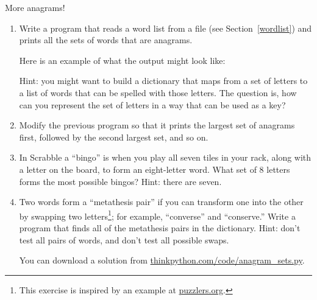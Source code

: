 \begin{exercise}
\label{anagrams}


More anagrams!

\begin{enumerate}

\item Write a program
that reads a word list from a file (see Section~\ref{wordlist}) and
prints all the sets of words that are anagrams.

Here is an example of what the output might look like:

\beforeverb
\begin{pyexo}
\end{pyexo}
\afterverb
%
Hint: you might want to build a dictionary that maps from a
set of letters to a list of words that can be spelled with those
letters.  The question is, how can you represent the set of
letters in a way that can be used as a key?

\item Modify the previous program so that it prints the largest set
of anagrams first, followed by the second largest set, and so on.


\item In Scrabble a ``bingo'' is when you play all seven tiles in
your rack, along with a letter on the board, to form an eight-letter
word.  What set of 8 letters forms the most possible bingos?
Hint: there are seven.



\item Two words form a ``metathesis pair'' if you can transform one
  into the other by swapping two letters\footnote{This exercise is
    inspired by an example at \url{puzzlers.org}.}; for example,
  ``converse'' and ``conserve.''  Write a program that finds all of
  the metathesis pairs in the dictionary.  Hint: don't test all pairs
  of words, and don't test all possible swaps.

You can download a solution from \url{thinkpython.com/code/anagram_sets.py}.

\end{enumerate}
\end{exercise}



